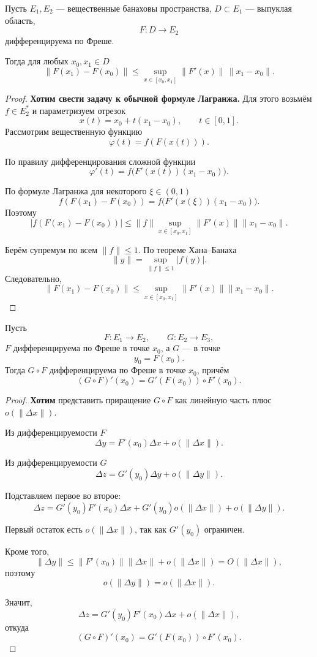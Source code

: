 \begin{theorem}
	Пусть \(E_1,E_2\) --- вещественные банаховы пространства,
	\(D\subset E_1\) --- выпуклая область,
	\[
	F:D\to E_2
	\]
	дифференцируема по Фреше.
	
	Тогда для любых \(x_0,x_1\in D\)
	\[
	\boxed{
		\|F(x_1)-F(x_0)\|
		\le
		\sup_{x\in[x_0,x_1]}\|F'(x)\|
		\,\|x_1-x_0\|
	}.
	\]
\end{theorem}

\begin{proof}
	\textbf{Хотим свести задачу к обычной формуле Лагранжа.}
	Для этого возьмём \(f\in E_2^*\) и параметризуем отрезок
	\[
	x(t)=x_0+t(x_1-x_0),\qquad t\in[0,1].
	\]
	Рассмотрим вещественную функцию
	\[
	\varphi(t)=f(F(x(t))).
	\]
	
	По правилу дифференцирования сложной функции
	\[
	\varphi'(t)
	=
	f\bigl(F'(x(t))(x_1-x_0)\bigr).
	\]
	
	По формуле Лагранжа для некоторого \(\xi\in(0,1)\)
	\[
	f(F(x_1)-F(x_0))
	=
	f\bigl(F'(x(\xi))(x_1-x_0)\bigr).
	\]
	Поэтому
	\[
	|f(F(x_1)-F(x_0))|
	\le
	\|f\|
	\sup_{x\in[x_0,x_1]}\|F'(x)\|
	\|x_1-x_0\|.
	\]
	
	Берём супремум по всем \(\|f\|\le1\). По теореме Хана--Банаха
	\[
	\|y\|=\sup_{\|f\|\le1}|f(y)|.
	\]
	Следовательно,
	\[
	\boxed{
		\|F(x_1)-F(x_0)\|
		\le
		\sup_{x\in[x_0,x_1]}\|F'(x)\|
		\|x_1-x_0\|
	}.
	\]
\end{proof}

\begin{theorem}
	Пусть
	\[
	F:E_1\to E_2,\qquad G:E_2\to E_3,
	\]
	\(F\) дифференцируема по Фреше в точке \(x_0\), а \(G\) ---
	в точке
	\[
	y_0=F(x_0).
	\]
	Тогда \(G\circ F\) дифференцируема по Фреше в точке \(x_0\), причём
	\[
	\boxed{
		(G\circ F)'(x_0)=G'(F(x_0))\circ F'(x_0)
	}.
	\]
\end{theorem}

\begin{proof}
	\textbf{Хотим} представить приращение \(G\circ F\) как линейную часть
	плюс \(o(\|\Delta x\|)\).
	
	Из дифференцируемости \(F\)
	\[
	\Delta y
	=
	F'(x_0)\Delta x+o(\|\Delta x\|).
	\]
	
	Из дифференцируемости \(G\)
	\[
	\Delta z
	=
	G'(y_0)\Delta y+o(\|\Delta y\|).
	\]
	
	Подставляем первое во второе:
	\[
	\Delta z
	=
	G'(y_0)F'(x_0)\Delta x
	+
	G'(y_0)o(\|\Delta x\|)
	+
	o(\|\Delta y\|).
	\]
	
	Первый остаток есть \(o(\|\Delta x\|)\), так как \(G'(y_0)\) ограничен.
	
	Кроме того,
	\[
	\|\Delta y\|
	\le
	\|F'(x_0)\|\|\Delta x\|+o(\|\Delta x\|)
	=
	O(\|\Delta x\|),
	\]
	поэтому
	\[
	o(\|\Delta y\|)=o(\|\Delta x\|).
	\]
	
	Значит,
	\[
	\Delta z
	=
	G'(y_0)F'(x_0)\Delta x+o(\|\Delta x\|),
	\]
	откуда
	\[
	(G\circ F)'(x_0)
	=
	G'(F(x_0))\circ F'(x_0).
	\]
\end{proof}